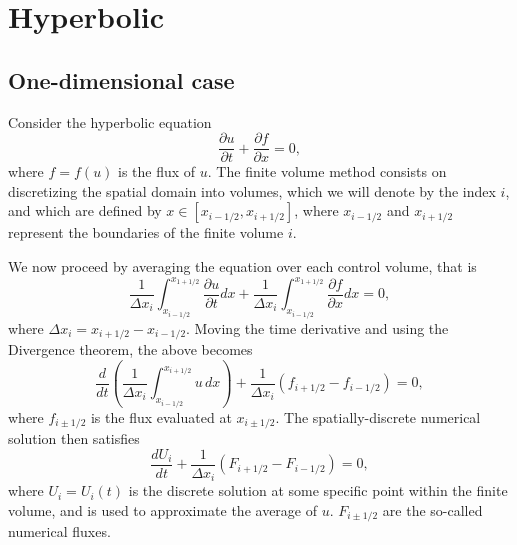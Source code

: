 \documentclass[oneside,a4paper,11pt]{report}
\begin{document}
\chapter{Hyperbolic}

\section{One-dimensional case}
Consider the hyperbolic equation
\begin{equation}
\frac{\partial u}{\partial t} + \frac{\partial f}{\partial x} = 0,
\end{equation}
where $f = f(u)$ is the flux of $u$. The finite volume method consists on discretizing the spatial domain into volumes, which we will denote by the index $i$, and which are defined by $x \in [x_{i-1/2}, x_{i+1/2}]$, where $x_{i-1/2}$ and $x_{i+1/2}$ represent the boundaries of the finite volume $i$.

We now proceed by averaging the equation over each control volume, that is
\begin{equation}
\frac{1}{\Delta x_i} \int_{x_{i-1/2}}^{x_{1+1/2}} \frac{\partial u}{\partial t} dx + \frac{1}{\Delta x_i} \int_{x_{i-1/2}}^{x_{1+1/2}} \frac{\partial f}{\partial x} dx = 0,
\end{equation}
where $\Delta x_i = x_{i+1/2} - x_{i-1/2}$. Moving the time derivative and using the Divergence theorem, the above becomes
\begin{equation}
\frac{d}{d t} \left( \frac{1}{\Delta x_i} \int_{x_{i-1/2}}^{x_{i+1/2}} u \,dx \right) + \frac{1}{\Delta x_i} ( f_{i+1/2} - f_{i-1/2} ) = 0,
\end{equation}
where $f_{i \pm 1/2}$ is the flux evaluated at $x_{i \pm 1/2}$. The spatially-discrete numerical solution then satisfies 
\begin{equation}
\frac{d U_i}{dt} + \frac{1}{\Delta x_i} ( F_{i+1/2} - F_{i-1/2} ) = 0,
\end{equation}
where $U_i = U_i(t)$ is the discrete solution at some specific point within the finite volume, and is used to approximate the average of $u$. $F_{i \pm 1/2}$ are the so-called numerical fluxes.
\end{document}

